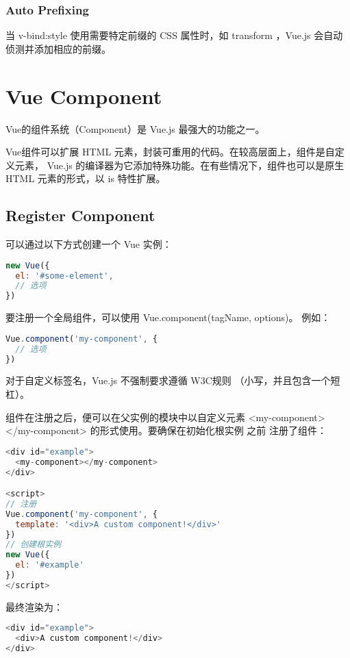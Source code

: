 \subsection{Auto Prefixing}

当 v-bind:style 使用需要特定前缀的 CSS 属性时，如 transform ，Vue.js 会自动侦测并添加相应的前缀。




\chapter{Vue Component}

Vue的组件系统（Component）是 Vue.js 最强大的功能之一。


Vue组件可以扩展 HTML 元素，封装可重用的代码。在较高层面上，组件是自定义元素， Vue.js 的编译器为它添加特殊功能。在有些情况下，组件也可以是原生 HTML 元素的形式，以 is 特性扩展。


\section{Register Component}

可以通过以下方式创建一个 Vue 实例：


\begin{lstlisting}[language=JavaScript]
new Vue({
  el: '#some-element',
  // 选项
})
\end{lstlisting}

要注册一个全局组件，可以使用 Vue.component(tagName, options)。 例如：

\begin{lstlisting}[language=JavaScript]
Vue.component('my-component', {
  // 选项
})
\end{lstlisting}

对于自定义标签名，Vue.js 不强制要求遵循 W3C规则 （小写，并且包含一个短杠）。

组件在注册之后，便可以在父实例的模块中以自定义元素 <my-component></my-component> 的形式使用。要确保在初始化根实例 之前 注册了组件：


\begin{lstlisting}[language=JavaScript]
<div id="example">
  <my-component></my-component>
</div>

<script>
// 注册
Vue.component('my-component', {
  template: '<div>A custom component!</div>'
})
// 创建根实例
new Vue({
  el: '#example'
})
</script>
\end{lstlisting}

最终渲染为：

\begin{lstlisting}[language=JavaScript]
<div id="example">
  <div>A custom component!</div>
</div>
\end{lstlisting}



